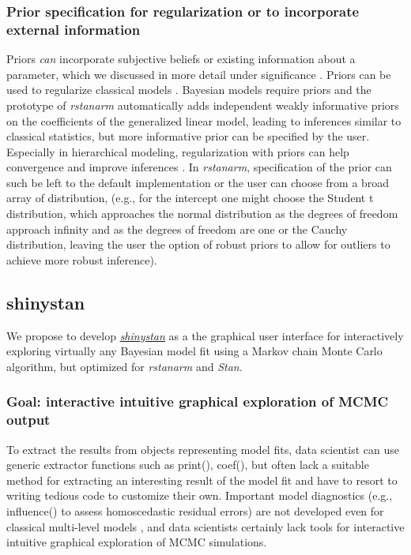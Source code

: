 \documentclass[11pt,notitlepage]{article}
\begin{document}
\subsubsection*{Prior specification for regularization or to incorporate external information}

Priors \textit{can} incorporate subjective beliefs or existing information 
about a parameter,  which we discussed in more detail under significance \cite{carlin1997bayes}. 
Priors can be used to regularize classical models \cite{gelman2008weakly}. 
Bayesian models require priors and the prototype of \textit{rstanarm} 
automatically adds independent weakly 
informative priors on the coefficients of the generalized linear model, 
leading to inferences similar to classical statistics,  but more informative 
prior can be specified by the user. Especially in hierarchical modeling, 
regularization with priors can help convergence and improve inferences 
\cite{Gelman-Hill_2014}. In \textit{rstanarm}, specification of the prior 
can such be left to the default implementation or the user can choose from 
a broad array of distribution, (e.g., for the intercept one might choose the 
Student t distribution, which approaches the normal distribution as the 
degrees of freedom approach infinity and as the degrees of freedom are 
one or the Cauchy distribution, leaving the user the option of robust 
priors to allow for outliers to achieve more robust inference). 


\subsection*{shinystan}
We propose to develop \href{http://andrewgelman.com/2015/03/02/introducing-shinystan/}
{\textit{shinystan}} as a the graphical user interface for interactively 
exploring virtually any Bayesian model fit using a Markov chain Monte Carlo algorithm, 
but optimized for \textit{rstanarm} and \textit{Stan}. 

\subsubsection*{Goal: interactive intuitive graphical exploration of MCMC output} 
To extract the results from objects representing model fits, data scientist can 
use generic extractor functions such as print(), coef(), but often lack a suitable 
method for extracting an interesting result of the model fit and have to resort to 
writing tedious code to customize their own. Important model diagnostics 
(e.g., influence() to assess  homoscedastic residual errors) are not 
developed even for classical multi-level models \cite{Galecki2013linear}, 
and data scientists certainly lack tools for interactive intuitive graphical 
exploration of MCMC simulations.
\end{document}
